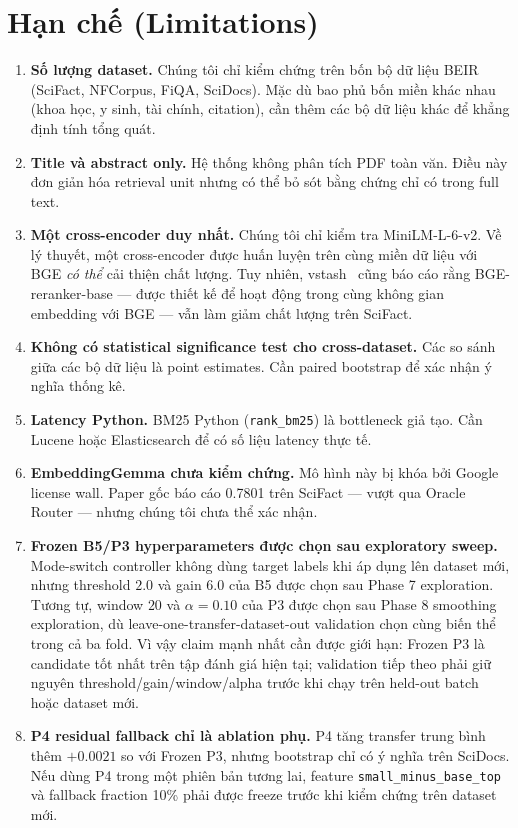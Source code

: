 \section{Hạn chế (Limitations)}
\label{sec:limitations}

\begin{enumerate}[leftmargin=2em,itemsep=3pt]
  \item \textbf{Số lượng dataset.} Chúng tôi chỉ kiểm chứng trên bốn bộ dữ liệu BEIR (SciFact, NFCorpus,
  FiQA, SciDocs). Mặc dù bao phủ bốn miền khác nhau (khoa học, y sinh, tài chính, citation), cần thêm
  các bộ dữ liệu khác để khẳng định tính tổng quát.

  \item \textbf{Title và abstract only.} Hệ thống không phân tích PDF toàn văn. Điều này đơn giản hóa
  retrieval unit nhưng có thể bỏ sót bằng chứng chỉ có trong full text.

  \item \textbf{Một cross-encoder duy nhất.} Chúng tôi chỉ kiểm tra MiniLM-L-6-v2. Về lý thuyết, một
  cross-encoder được huấn luyện trên cùng miền dữ liệu với BGE \emph{có thể} cải thiện chất lượng. Tuy
  nhiên, vstash~\citep{steffens2026vstash} cũng báo cáo rằng BGE-reranker-base --- được thiết kế để hoạt
  động trong cùng không gian embedding với BGE --- vẫn làm giảm chất lượng trên SciFact.

  \item \textbf{Không có statistical significance test cho cross-dataset.} Các so sánh giữa các bộ dữ
  liệu là point estimates. Cần paired bootstrap để xác nhận ý nghĩa thống kê.

  \item \textbf{Latency Python.} BM25 Python (\texttt{rank\_bm25}) là bottleneck giả tạo. Cần Lucene hoặc
  Elasticsearch để có số liệu latency thực tế.

  \item \textbf{EmbeddingGemma chưa kiểm chứng.} Mô hình này bị khóa bởi Google license wall. Paper gốc
  báo cáo 0.7801 trên SciFact --- vượt qua Oracle Router --- nhưng chúng tôi chưa thể xác nhận.

  \item \textbf{Frozen B5/P3 hyperparameters được chọn sau exploratory sweep.} Mode-switch controller
  không dùng target labels khi áp dụng lên dataset mới, nhưng threshold $2.0$ và gain $6.0$ của B5 được
  chọn sau Phase 7 exploration. Tương tự, window $20$ và $\alpha=0.10$ của P3 được chọn sau Phase 8
  smoothing exploration, dù leave-one-transfer-dataset-out validation chọn cùng biến thể trong cả ba
  fold. Vì vậy claim mạnh nhất cần được giới hạn: Frozen P3 là candidate tốt nhất trên tập đánh giá hiện
  tại; validation tiếp theo phải giữ nguyên threshold/gain/window/alpha trước khi chạy trên held-out
  batch hoặc dataset mới.

  \item \textbf{P4 residual fallback chỉ là ablation phụ.} P4 tăng transfer trung bình thêm $+0.0021$
  so với Frozen P3, nhưng bootstrap chỉ có ý nghĩa trên SciDocs. Nếu dùng P4 trong một phiên bản tương
  lai, feature \texttt{small\_minus\_base\_top} và fallback fraction 10\% phải được freeze trước khi
  kiểm chứng trên dataset mới.
\end{enumerate}
